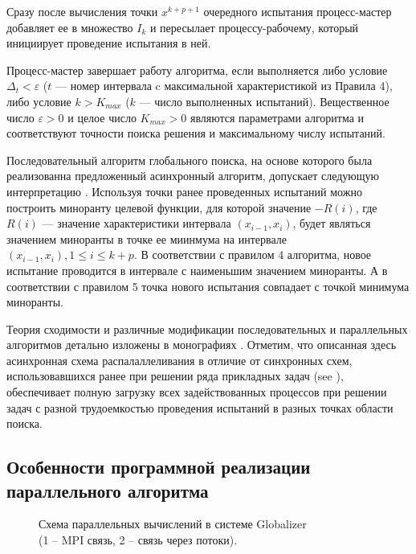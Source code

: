 \documentclass[mathematics,article,submit,pdftex,moreauthors]{Definitions/mdpi}
\begin{document}
Сразу после вычисления точки $x^{k+p+1}$ очередного испытания процесс-мастер добавляет ее в множество $I_k$ и пересылает процессу-рабочему, который инициирует проведение испытания в ней. 

Процесс-мастер завершает работу алгоритма, если выполняется либо условие $\Delta_{t}<\varepsilon$ ($t$ --- номер интервала c максимальной характеристикой из Правила 4), либо условие $k>K_{max}$ ($k$ --- число выполненных испытаний).
Вещественное число $\varepsilon>0$ и целое число $K_{max}>0$ являются параметрами алгоритма и соответствуют точности поиска решения и максимальному числу испытаний.

Последовательный алгоритм глобального поиска, на основе которого была реализованна предложенный асинхронный алгоритм, допускает следующую интерпретацию \cite{Molinaro2001}. Используя точки ранее проведенных испытаний можно построить миноранту целевой функции, для которой значение $-R(i)$, где $R(i)$ --- значение характеристики интервала $(x_{i-1},x_i)$, будет являться значением миноранты в точке ее миинмума на интервале $(x_{i-1},x_i), 1\leq i\leq k+p$. В соответствии с правилом 4 алгоритма, новое испытание проводится в интервале с наименьшим значением миноранты. А в соответствии с правилом 5 точка нового испытания совпадает с точкой минимума миноранты.

Теория сходимости и различные модификации последовательных и параллельных алгоритмов детально изложены в монографиях \cite{Strongin2000,Sergeyev2017}. 
Отметим, что описанная здесь асинхронная схема распалаллеливания в отличие от синхронных схем, использовавшихся ранее при решении ряда прикладных задач (see \cite{Kalyulin2017,Modorskii2016}), обеспечивает полную загрузку всех задействованных процессов при решении задач с разной трудоемкостью проведения испытаний в разных точках области поиска.



\subsection{Особенности программной реализации параллельного алгоритма}

\begin{figure}
\caption{Схема параллельных вычислений в системе Globalizer \\ (1 -- MPI связь, 2 -- связь через потоки).}\label{fig:Impl}
\end{figure}   
\end{document}
